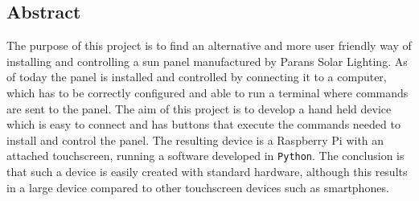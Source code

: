 \documentclass[a4paper]{article}
\begin{document}
    \subsection*{Abstract} %
    \label{sub:abstract}
            The purpose of this project is to find an alternative and more 
            user friendly way of installing and controlling a sun panel 
            manufactured by Parans Solar Lighting. As of today the panel is 
            installed and controlled by connecting it to a computer, 
            which has to be correctly configured and able to run a terminal 
            where commands are sent to the panel. The aim of this project is 
            to develop a hand held device which is easy to connect and has 
            buttons that execute the commands needed to install and control 
            the panel. The resulting device is a Raspberry Pi with an attached
            touchscreen, running a software developed in \texttt{Python}.  
            The conclusion is that such a device is easily created with standard
            hardware, although this results in a large device 
            compared to other touchscreen devices such as smartphones.
            
\end{document}
